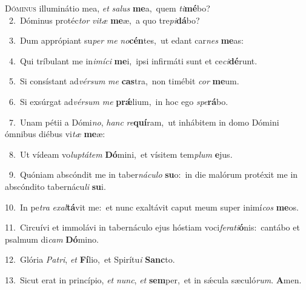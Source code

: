 \lettrine{\initial\textcolor{\initialcolor}{D}}{óminus} illuminátio mea, \textit{et} \textit{sa}\-\textit{lus} \textbf{me}\-a,~\star quem \textit{ti}\-\textbf{mé}bo?\\
{\numbfont\textcolor{\numbcolor}{~2.}}~Dóminus protéc\textit{tor} \textit{vi}\-\textit{tæ} \textbf{me}\-æ,~\star a quo tre\-\textit{pi}\-\textbf{dá}bo?\par
{\numbfont\textcolor{\numbcolor}{~3.}}~Dum apprópiant su\textit{per} \textit{me} \textit{no}\-\textbf{cén}tes,~\star ut edant car\textit{nes} \textbf{me}\-as:\par
{\numbfont\textcolor{\numbcolor}{~4.}}~Qui tríbulant me in\-\textit{i}\-\textit{mí}\textit{ci} \textbf{me}\-i,~\star ipsi infirmáti sunt et ce\-\textit{ci}\-\textbf{dé}runt.\par
{\numbfont\textcolor{\numbcolor}{~5.}}~Si consístant ad\-\textit{vér}\-\textit{sum} \textit{me} \textbf{cas}\-tra,~\star non timébit \textit{cor} \textbf{me}\-um.\par
{\numbfont\textcolor{\numbcolor}{~6.}}~Si exsúrgat ad\-\textit{vér}\-\textit{sum} \textit{me} \textbf{prǽ}\-lium,~\star in hoc ego \textit{spe}\-\textbf{rá}bo.\par
{\numbfont\textcolor{\numbcolor}{~7.}}~Unam pétii a Dómi\-\textit{no}\-, \textit{hanc} \textit{re}\-\textbf{quí}ram,~\star ut inhábitem in domo Dómini ómnibus diébus vi\textit{tæ} \textbf{me}\-æ:\par
{\numbfont\textcolor{\numbcolor}{~8.}}~Ut vídeam vo\-\textit{lup}\-\textit{tá}\textit{tem} \textbf{Dó}\-mini,~\star et vísitem tem\textit{plum} \textbf{e}\-jus.\par
{\numbfont\textcolor{\numbcolor}{~9.}}~Quóniam abscóndit me in taber\-\textit{ná}\-\textit{cu}\textit{lo} \textbf{su}\-o:~\star in die malórum protéxit me in abscóndito tabernácu\textit{li} \textbf{su}\-i.\par
{\numbfont\textcolor{\numbcolor}{10.}}~In pe\textit{tra} \textit{ex}\-\textit{al}\textbf{tá}vit me:~\star et nunc exaltávit caput meum super inimí\textit{cos} \textbf{me}\-os.\par
{\numbfont\textcolor{\numbcolor}{11.}}~Circuívi et immolávi in tabernáculo ejus hóstiam voci\-\textit{fe}\-\textit{ra}\textit{ti}\textbf{ó}nis:~\star cantábo et psalmum di\textit{cam} \textbf{Dó}\-mino.\par
{\numbfont\textcolor{\numbcolor}{12.}}~Glória \textit{Pa}\-\textit{tri}, \textit{et} \textbf{Fí}\-lio,~\star et Spirítu\textit{i} \textbf{Sanc}\-to.\par
{\numbfont\textcolor{\numbcolor}{13.}}~Sicut erat in princípio, \textit{et} \textit{nunc}\-, \textit{et} \textbf{sem}\-per,~\star et in sǽcula sæculó\-\textit{rum}\-. \textbf{A}\-men.\par
